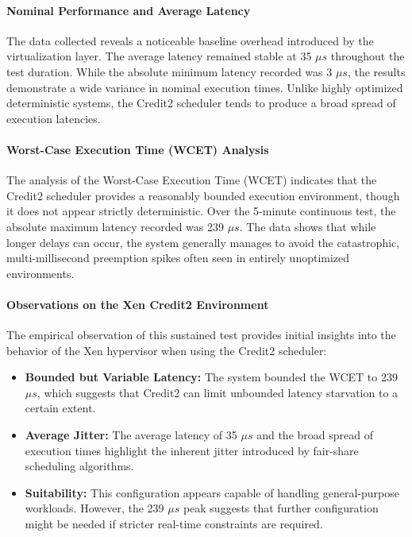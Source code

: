 \paragraph{Nominal Performance and Average
Latency}\label{nominal-performance-and-average-latency-11}

The data collected reveals a noticeable baseline overhead introduced by
the virtualization layer. The average latency remained stable at 35 $\mu s$
throughout the test duration. While the absolute minimum latency
recorded was 3 $\mu s$, the results demonstrate a wide variance in nominal
execution times. Unlike highly optimized deterministic systems, the
Credit2 scheduler tends to produce a broad spread of execution
latencies.

\paragraph{Worst-Case Execution Time (WCET)
Analysis}\label{worst-case-execution-time-wcet-analysis-13}

The analysis of the Worst-Case Execution Time (WCET) indicates that the
Credit2 scheduler provides a reasonably bounded execution environment,
though it does not appear strictly deterministic. Over the 5-minute
continuous test, the absolute maximum latency recorded was 239 $\mu s$. The
data shows that while longer delays can occur, the system generally
manages to avoid the catastrophic, multi-millisecond preemption spikes
often seen in entirely unoptimized environments.

\paragraph{Observations on the Xen Credit2
Environment}\label{observations-on-the-xen-credit2-environment-1}

The empirical observation of this sustained test provides initial
insights into the behavior of the Xen hypervisor when using the Credit2
scheduler:

\begin{itemize}
\item
  \textbf{Bounded but Variable Latency:} The system bounded the WCET to
  239 $\mu s$, which suggests that Credit2 can limit unbounded latency
  starvation to a certain extent.
\item
  \textbf{Average Jitter:} The average latency of 35 $\mu s$ and the broad
  spread of execution times highlight the inherent jitter introduced by
  fair-share scheduling algorithms.
\item
  \textbf{Suitability:} This configuration appears capable of handling
  general-purpose workloads. However, the 239 $\mu s$ peak suggests that
  further configuration might be needed if stricter real-time
  constraints are required.
\end{itemize}

